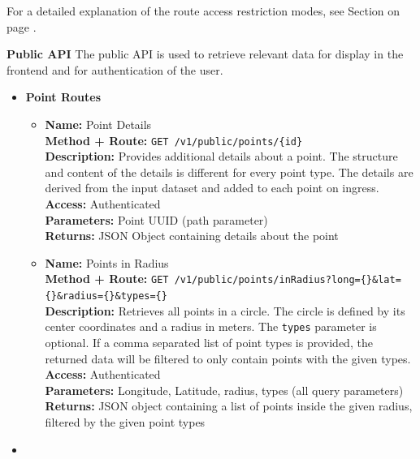 For a detailed explanation of the route access restriction modes, see Section
\textbf{} on page \pageref{route_authorisation}.

\textbf{Public API}
The public API is used to retrieve relevant data for display in the frontend and
for authentication of the user.

\begin{itemize}
  \item{
    \textbf{Point Routes}
    \begin{itemize}
      \item { \textbf{Name:} Point Details\\
          \textbf{Method + Route:} \texttt{GET /v1/public/points/\{id\}}\\
          \textbf{Description:} Provides additional details about a point. The
          structure and content of the details is different for every point
          type. The details are derived from the input dataset and added to each
          point on ingress.\\
          \textbf{Access:} Authenticated\\
          \textbf{Parameters:} Point UUID (path parameter)\\
          \textbf{Returns:} JSON Object containing details about the point\\
        }
      \item { \textbf{Name:} Points in Radius\\
          \textbf{Method + Route:} \texttt{GET
          /v1/public/points/inRadius?long=\{\}\&lat=\{\}\&radius=\{\}\&types=\{\}}\\
          \textbf{Description:} Retrieves all points in a circle. The circle is
          defined by its center coordinates and a radius in meters. The
          \texttt{types} parameter is optional. If a comma separated list of
          point types is provided, the returned data will be filtered to only
          contain points with the given types.\\
          \textbf{Access:} Authenticated\\
          \textbf{Parameters:} Longitude, Latitude, radius, types (all query
          parameters)\\
          \textbf{Returns:} JSON object containing a list of points inside the
          given radius, filtered by the given point types\\
        }
    \end{itemize}
  }
  \item{
}
\end{itemize}
